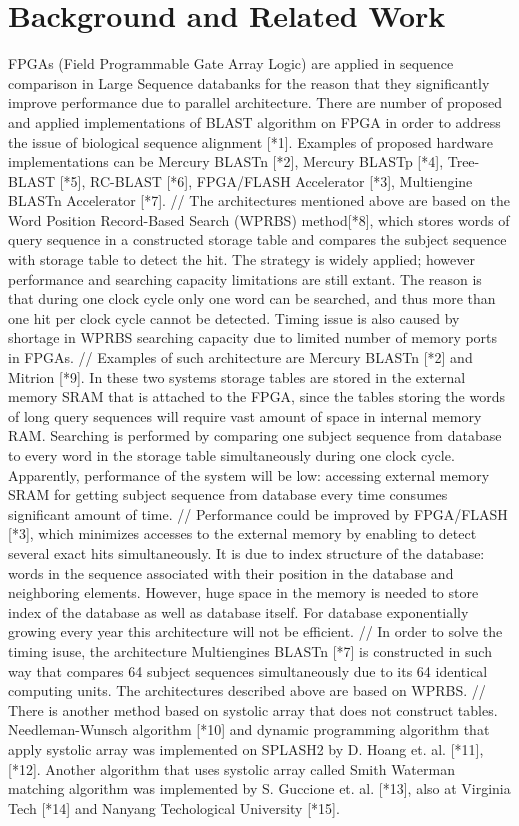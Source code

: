 \section{Background and Related Work}
\label{sec:background}

FPGAs (Field Programmable Gate Array Logic) are applied in sequence comparison in Large Sequence databanks for the reason that they significantly improve performance due to parallel architecture. There are number of proposed and applied implementations of BLAST algorithm on FPGA in order to address the issue of biological sequence alignment [*1]. Examples of proposed hardware implementations can be Mercury BLASTn [*2], Mercury BLASTp [*4], Tree-BLAST [*5], RC-BLAST [*6], FPGA/FLASH Accelerator [*3], Multiengine BLASTn Accelerator  [*7]. 
//
The architectures mentioned above are based on the Word Position Record-Based Search (WPRBS) method[*8], which stores words of query sequence in a constructed storage table and compares the subject sequence with storage table to detect the hit. The strategy is widely applied; however performance and searching capacity limitations are still extant. The reason is that during one clock cycle only one word can be searched, and thus more than one hit per clock cycle cannot be detected. Timing issue is also caused by shortage in WPRBS searching capacity due to limited number of memory ports in FPGAs.
//
Examples of such architecture are Mercury BLASTn [*2] and Mitrion [*9]. In these two systems storage tables are stored in the external memory SRAM that is attached to the FPGA, since the tables storing the words of long query sequences will require vast amount of space in internal memory RAM. Searching is performed by comparing one subject sequence from database to every word in the storage table simultaneously during one clock cycle. Apparently, performance of the system will be low: accessing external memory SRAM for getting subject sequence from database every time consumes significant amount of time.    
//     
Performance could be improved by FPGA/FLASH [*3], which minimizes accesses to the external memory by enabling to detect several exact hits simultaneously. It is due to index structure of the database: words in the sequence associated with their position in the database and neighboring elements. However, huge space in the memory is needed to store index of the database as well as database itself. For database exponentially growing every year this architecture will not be efficient. 
//
In order to solve the timing isuse, the architecture Multiengines BLASTn [*7] is constructed in such way that compares 64 subject sequences simultaneously due to its 64 identical computing units. The architectures described above are based on WPRBS.
//
There is another method based on systolic array that does not construct tables. Needleman-Wunsch algorithm [*10] and dynamic programming algorithm that apply systolic array was implemented on SPLASH2 by D. Hoang et. al. [*11], [*12]. Another algorithm that uses systolic array called Smith Waterman matching algorithm was implemented by S. Guccione et. al. [*13], also at Virginia Tech [*14] and Nanyang Techological University [*15]. 

